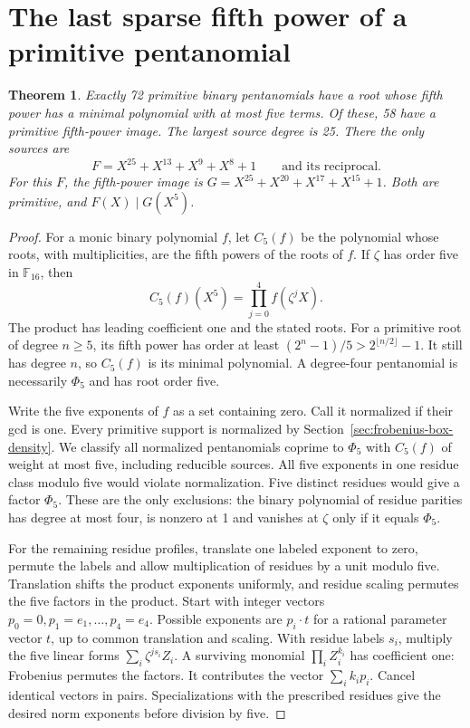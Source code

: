 \documentclass[11pt]{article}
\newtheorem{theorem}{Theorem}
\begin{document}
\section{The last sparse fifth power of a primitive pentanomial}
\label{sec:fifth-chains}

\begin{theorem}
Exactly 72 primitive binary pentanomials have a root whose fifth power
has a minimal polynomial with at most five terms. Of these, 58 have a
primitive fifth-power image. The largest source degree is 25. There the
only sources are
\[
 F=X^{25}+X^{13}+X^9+X^8+1
 \qquad\text{and its reciprocal.}
\]
For this \(F\), the fifth-power image is \(G=X^{25}+X^{20}+X^{17}+X^{15}+1\).
Both are primitive, and \(F(X)\mid G(X^5)\).
\end{theorem}

\begin{proof}
For a monic binary polynomial \(f\), let \(C_5(f)\) be the polynomial
whose roots, with multiplicities, are the fifth powers of the roots of
\(f\). If \(\zeta\) has order five in \(\mathbb F_{16}\), then
\[
 C_5(f)(X^5)=\prod_{j=0}^4 f(\zeta^j X).
\]
The product has leading coefficient one and the stated roots. For a
primitive root of degree \(n\ge5\), its fifth power has order at least
\((2^n-1)/5>2^{\lfloor n/2\rfloor}-1\). It still has degree \(n\),
so \(C_5(f)\) is its minimal polynomial. A degree-four pentanomial
is necessarily \(\Phi_5\) and has root order five.

Write the five exponents of \(f\) as a set containing zero. Call it
normalized if their gcd is one. Every primitive support is normalized
by Section~\ref{sec:frobenius-box-density}. We classify all normalized
pentanomials coprime to \(\Phi_5\) with \(C_5(f)\) of weight at most
five, including reducible sources. All five exponents in one residue
class modulo five would violate normalization. Five distinct residues
would give a factor \(\Phi_5\). These are the only exclusions:
the binary polynomial of residue parities has degree at most four,
is nonzero at 1 and vanishes at \(\zeta\) only if it equals \(\Phi_5\).

For the remaining residue profiles, translate one labeled exponent to
zero, permute the labels and allow multiplication of residues by a unit
modulo five. Translation shifts the product exponents uniformly, and
residue scaling permutes the five factors in the product. Start with
integer vectors \(p_0=0,p_1=e_1,\ldots,p_4=e_4\). Possible exponents
are \(p_i\cdot t\) for a rational parameter vector \(t\), up to common
translation and scaling. With residue labels \(s_i\), multiply the
five linear forms \(\sum_i\zeta^{js_i} Z_i\). A surviving monomial
\(\prod_i Z_i^{k_i}\) has coefficient one: Frobenius permutes the
factors. It contributes the vector \(\sum_i k_i p_i\). Cancel
identical vectors in pairs. Specializations with the prescribed
residues give the desired norm exponents before division by five.


\end{proof}
\end{document}
